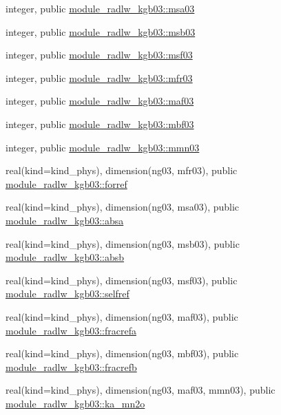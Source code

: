 \begin{DoxyCompactItemize}
\item 
integer, public \hyperlink{namespacemodule__radlw__kgb03_a78658032153f7a4cbeaa198cbe661244}{module\+\_\+radlw\+\_\+kgb03\+::msa03}
\item 
integer, public \hyperlink{group__module__radlw__main_gac57ba9584cbc3a5e4e2e0a6b548d21e9}{module\+\_\+radlw\+\_\+kgb03\+::msb03}
\item 
integer, public \hyperlink{group__module__radlw__main_gaf553bb46aa3ea6bcbb945cb2c2778955}{module\+\_\+radlw\+\_\+kgb03\+::msf03}
\item 
integer, public \hyperlink{group__module__radlw__main_ga4ea1e58a39585adc087718b92a16b529}{module\+\_\+radlw\+\_\+kgb03\+::mfr03}
\item 
integer, public \hyperlink{group__module__radlw__main_ga90d1081db011f0682cb4a83c40c5bb23}{module\+\_\+radlw\+\_\+kgb03\+::maf03}
\item 
integer, public \hyperlink{group__module__radlw__main_ga655fff8711d78d62ae9d4fa27d02621a}{module\+\_\+radlw\+\_\+kgb03\+::mbf03}
\item 
integer, public \hyperlink{group__module__radlw__main_gab4e84b10460930267256c0e5a1fe7a55}{module\+\_\+radlw\+\_\+kgb03\+::mmn03}
\item 
real(kind=kind\+\_\+phys), dimension(ng03, mfr03), public \hyperlink{group__module__radlw__main_gafcc55fa81ba6369b56d29db2342c2e6a}{module\+\_\+radlw\+\_\+kgb03\+::forref}
\item 
real(kind=kind\+\_\+phys), dimension(ng03, msa03), public \hyperlink{group__module__radlw__main_gac65fd4afedbd4bfa2c87c5e4f060a1d4}{module\+\_\+radlw\+\_\+kgb03\+::absa}
\item 
real(kind=kind\+\_\+phys), dimension(ng03, msb03), public \hyperlink{group__module__radlw__main_gaa84ba66e0a3cc018b03bd13c9c21e133}{module\+\_\+radlw\+\_\+kgb03\+::absb}
\item 
real(kind=kind\+\_\+phys), dimension(ng03, msf03), public \hyperlink{group__module__radlw__main_ga6bb40d898660e6dfc056d3efe1d0c544}{module\+\_\+radlw\+\_\+kgb03\+::selfref}
\item 
real(kind=kind\+\_\+phys), dimension(ng03, maf03), public \hyperlink{group__module__radlw__main_ga26e901a002e789933c5c9b622f3a0932}{module\+\_\+radlw\+\_\+kgb03\+::fracrefa}
\item 
real(kind=kind\+\_\+phys), dimension(ng03, mbf03), public \hyperlink{group__module__radlw__main_gaf1d33a7362e73bf40ef592bc9863b612}{module\+\_\+radlw\+\_\+kgb03\+::fracrefb}
\item 
real(kind=kind\+\_\+phys), dimension(ng03, maf03, mmn03), public \hyperlink{group__module__radlw__main_gaeeba4e0a8fc97c557e1127b4d5d1bd94}{module\+\_\+radlw\+\_\+kgb03\+::ka\+\_\+mn2o}

\end{DoxyCompactItemize}
